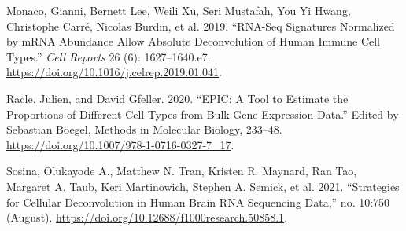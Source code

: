 \documentclass[]{article}
\newlength{\cslhangindent}
\newenvironment{CSLReferences}[2] %
 {%
  \setlength{\parindent}{0pt}
  \ifodd #1 \everypar{\setlength{\hangindent}{\cslhangindent}}\ignorespaces\fi
  \ifnum #2 > 0
  \setlength{\parskip}{#2\baselineskip}
  \fi
 }%
 {}
\begin{document}
\hypertarget{refs}{}
\begin{CSLReferences}{1}{0}
\leavevmode{}%
Monaco, Gianni, Bernett Lee, Weili Xu, Seri Mustafah, You Yi Hwang, Christophe Carré, Nicolas Burdin, et al. 2019. {``{RNA}-{Seq} {Signatures} {Normalized} by {mRNA} {Abundance} {Allow} {Absolute} {Deconvolution} of {Human} {Immune} {Cell} {Types}.''} \emph{Cell Reports} 26 (6): 1627--1640.e7. \url{https://doi.org/10.1016/j.celrep.2019.01.041}.

\leavevmode{}%
Racle, Julien, and David Gfeller. 2020. {``{EPIC}: {A} {Tool} to {Estimate} the {Proportions} of {Different} {Cell} {Types} from {Bulk} {Gene} {Expression} {Data}.''} Edited by Sebastian Boegel, Methods in {Molecular} {Biology}, 233--48. \url{https://doi.org/10.1007/978-1-0716-0327-7_17}.

\leavevmode{}%
Sosina, Olukayode A., Matthew N. Tran, Kristen R. Maynard, Ran Tao, Margaret A. Taub, Keri Martinowich, Stephen A. Semick, et al. 2021. {``Strategies for Cellular Deconvolution in Human Brain {RNA} Sequencing Data,''} no. 10:750 (August). \url{https://doi.org/10.12688/f1000research.50858.1}.

\end{CSLReferences}
\end{document}
